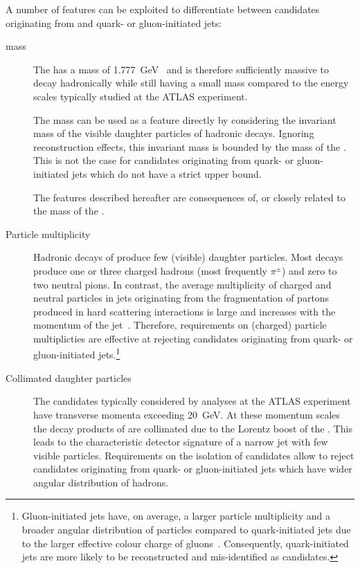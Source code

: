 A number of features can be exploited to differentiate between
\tauhadvis candidates originating from \tauhad and quark- or
gluon-initiated jets:
\begin{description}

\item[\taulepton mass] The \taulepton has a mass of
  \SI{1.777}{\GeV}~\cite{pdg2020} and is therefore sufficiently
  massive to decay hadronically while still having a small mass
  compared to the energy scales typically studied at the ATLAS
  experiment.

  The \taulepton mass can be used as a feature directly by considering
  the invariant mass of the visible daughter particles of hadronic
  \taulepton decays. Ignoring reconstruction effects, this invariant
  mass is bounded by the mass of the \taulepton. This is not the case
  for \tauhadvis candidates originating from quark- or gluon-initiated
  jets which do not have a strict upper bound.

  The features described hereafter are consequences of, or closely
  related to the mass of the \taulepton.

\item[Particle multiplicity] Hadronic decays of \tauleptons produce
  few (visible) daughter particles. Most decays produce one or three
  charged hadrons (most frequently $\pi^{\pm}$) and zero to two
  neutral pions.
  In contrast, the average multiplicity of charged and neutral
  particles in jets originating from the fragmentation of partons
  produced in hard scattering interactions is large and increases with
  the momentum of the
  jet~\cite{Ellis:1996mzs,STDM-2015-12}. Therefore, requirements on
  (charged) particle multiplicties are effective at rejecting
  \tauhadvis candidates originating from quark- or gluon-initiated
  jets.\footnote{Gluon-initiated jets have, on average, a larger
    particle multiplicity and a broader angular distribution of
    particles compared to quark-initiated jets due to the larger
    effective colour charge of
    gluons~\cite{Ellis:1996mzs}. Consequently, quark-initiated jets
    are more likely to be reconstructed and mis-identified as
    \tauhadvis candidates.}

\item[Collimated daughter particles] The \tauhadvis candidates
  typically considered by analyses at the ATLAS experiment have
  transverse momenta exceeding \SI{20}{\GeV}. At these momentum scales
  the decay products of \tauleptons are collimated due to the Lorentz
  boost of the \taulepton. This leads to the characteristic detector
  signature of a narrow jet with few visible particles. Requirements
  on the isolation of \tauhadvis candidates allow to reject candidates
  originating from quark- or gluon-initiated jets which have wider
  angular distribution of hadrons.


\end{description}
